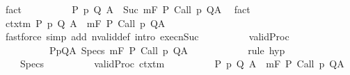\begin{isabellebody}
\ fact\isanewline
\ \ \ \ \ \ \ \ \isamarkupfalse%
\ {\isachardoublequoteopen}{\isasymforall}{\isacharparenleft}P{\isacharcomma}\ p{\isacharcomma}\ Q{\isacharcomma}\ A{\isacharparenright}{\isasymin}{\isasymTheta}{\isachardot}\ {\isasymGamma}\ {\isasymTurnstile}Suc\ m{\isacharcolon}\isactrlbsub {\isacharslash}F\isactrlesub \ P\ {\isacharparenleft}Call\ p{\isacharparenright}\ Q{\isacharcomma}A{\isachardoublequoteclose}\ \isamarkupfalse%
\ fact\isanewline
\ \ \ \ \ \ \ \ \isamarkupfalse%
\ ctxt{\isacharunderscore}m{\isacharcolon}\ {\isachardoublequoteopen}{\isasymforall}{\isacharparenleft}P{\isacharcomma}\ p{\isacharcomma}\ Q{\isacharcomma}\ A{\isacharparenright}{\isasymin}{\isasymTheta}{\isachardot}\ {\isasymGamma}\ {\isasymTurnstile}m{\isacharcolon}\isactrlbsub {\isacharslash}F\isactrlesub \ P\ {\isacharparenleft}Call\ p{\isacharparenright}\ Q{\isacharcomma}A{\isachardoublequoteclose}\isanewline
\ \ \ \ \ \ \ \ \ \ \isamarkupfalse%
\ {\isacharparenleft}fastforce\ simp\ add{\isacharcolon}\ nvalid{\isacharunderscore}def\ intro{\isacharcolon}\ execn{\isacharunderscore}Suc{\isacharparenright}\isanewline
\ \ \ \ \ \ \ \ \isamarkupfalse%
\ valid{\isacharunderscore}Proc{\isacharcolon}\isanewline
\ \ \ \ \ \ \ \ \ \ {\isachardoublequoteopen}{\isasymforall}{\isacharparenleft}P{\isacharcomma}p{\isacharcomma}Q{\isacharcomma}A{\isacharparenright}\ {\isasymin}Specs{\isachardot}\ {\isasymGamma}{\isasymTurnstile}m{\isacharcolon}\isactrlbsub {\isacharslash}F\isactrlesub \ P\ {\isacharparenleft}Call\ p{\isacharparenright}\ Q{\isacharcomma}A{\isachardoublequoteclose}\isanewline
\ \ \ \ \ \ \ \ \ \ \isamarkupfalse%
\ {\isacharparenleft}rule\ hyp{\isacharparenright}\isanewline
\ \ \ \ \ \ \ \ \isamarkupfalse%
\ {\isacharquery}{\isasymTheta}{\isacharprime}{\isacharequal}\ {\isachardoublequoteopen}{\isasymTheta}\ {\isasymunion}\ Specs{\isachardoublequoteclose}\isanewline
\ \ \ \ \ \ \ \ \isamarkupfalse%
\ valid{\isacharunderscore}Proc\ ctxt{\isacharunderscore}m\isanewline
\ \ \ \ \ \ \ \ \isamarkupfalse%
\ {\isachardoublequoteopen}{\isasymforall}{\isacharparenleft}P{\isacharcomma}\ p{\isacharcomma}\ Q{\isacharcomma}\ A{\isacharparenright}{\isasymin}{\isacharquery}{\isasymTheta}{\isacharprime}{\isachardot}\ {\isasymGamma}\ {\isasymTurnstile}m{\isacharcolon}\isactrlbsub {\isacharslash}F\isactrlesub \ P\ {\isacharparenleft}Call\ p{\isacharparenright}\ Q{\isacharcomma}A{\isachardoublequoteclose}\isanewline
\ \ \ \ \ \ \ \ \ \ \isamarkupfalse%

\end{isabellebody}
